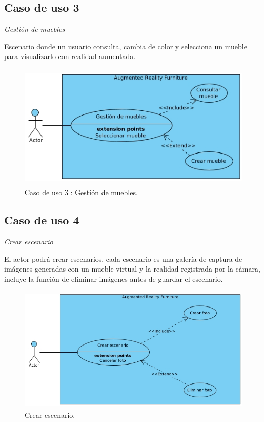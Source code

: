 \subsection{Caso de uso 3} \textit{Gestión de muebles} \par
Escenario donde un usuario consulta, cambia de color y selecciona un mueble para visualizarlo con realidad aumentada.
\begin{figure}[h!]
	\centering
	\includegraphics[width=12cm,height=6cm]{imagenes/analisis/seleccionarMueble.jpg}
	\caption{Caso de uso 3 : Gestión de muebles.}
	\label{fig:analogo}
\end{figure}

\subsection{Caso de uso 4}\textit{Crear escenario} \par
El actor podrá crear escenarios, cada escenario es una galería de captura de imágenes generadas con un mueble virtual y la realidad registrada por la cámara, incluye la función de eliminar imágenes antes de guardar el escenario.
\begin{figure}[h!]
	\centering
	\includegraphics[width=12cm,height=6cm]{imagenes/analisis/crearEscenario.jpg}
	\caption{Crear escenario.}
	\label{fig:analogo}
\end{figure}


